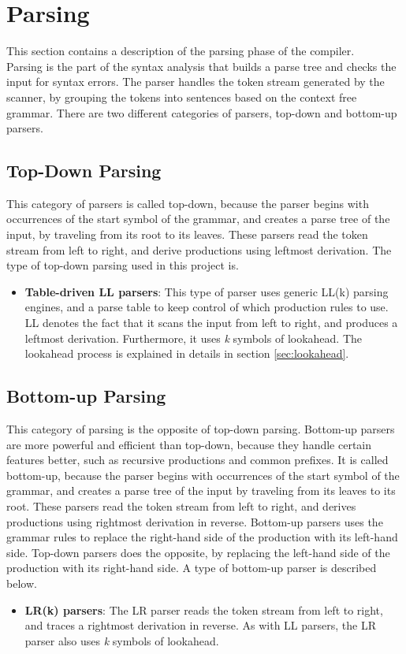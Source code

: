 \section{Parsing}
This section contains a description of the parsing phase of the compiler. 
\\Parsing is the part of the syntax analysis that builds a parse tree and checks the input for syntax errors. The parser handles the token stream generated by the scanner, by grouping the tokens into sentences based on the context free grammar. There are two different categories of parsers, top-down and bottom-up parsers.

\subsection{Top-Down Parsing}
This category of parsers is called top-down, because the parser begins with occurrences of the start symbol of the grammar, and creates a parse tree of the input, by traveling from its root to its leaves. These parsers read the token stream from left to right, and derive productions using leftmost derivation. The type of top-down parsing used in this project is.

\begin{itemize}
\item \textbf{Table-driven LL parsers}: This type of parser uses generic LL(k) parsing engines, and a parse table to keep control of which production rules to use. LL denotes the fact that it scans the input from left to right, and produces a leftmost derivation. Furthermore, it uses \textit{k} symbols of lookahead. The lookahead process is explained in details in section \ref{sec:lookahead}.
\end{itemize}

\subsection{Bottom-up Parsing}
This category of parsing is the opposite of top-down parsing. Bottom-up parsers are more powerful and efficient than top-down, because they handle certain features better, such as recursive productions and common prefixes. It is called bottom-up, because the parser begins with occurrences of the start symbol of the grammar, and creates a parse tree of the input by traveling from its leaves to its root. These parsers read the token stream from left to right, and derives productions using rightmost derivation in reverse. Bottom-up parsers uses the grammar rules to replace the right-hand side of the production with its left-hand side. Top-down parsers does the opposite, by replacing the left-hand side of the production with its right-hand side. A type of bottom-up parser is described below. 

\begin{itemize}
\item \textbf{LR(k) parsers}: The LR parser reads the token stream from left to right, and traces a rightmost derivation in reverse. As with LL parsers, the LR parser also uses \textit{k} symbols of lookahead.  
\end{itemize}
